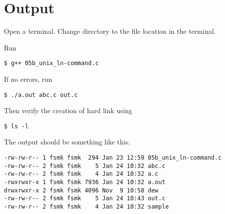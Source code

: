 

\section{Output}

Open a terminal. Change directory to the file location in the terminal.

Run
\begin{lstlisting}[style=shell-command]
$ g++ 05b_unix_ln-command.c
\end{lstlisting}

If no errors, run
\begin{lstlisting}[style=shell-command]
$ ./a.out abc.c out.c
\end{lstlisting}

Then verify the creation of hard link using
\begin{lstlisting}[style=shell-command]
$ ls -l
\end{lstlisting}


The output should be something like this.
\begin{lstlisting}[style=shell-output]
-rw-rw-r-- 1 fsmk fsmk  294 Jan 23 12:59 05b_unix_ln-command.c
-rw-rw-r-- 2 fsmk fsmk    5 Jan 24 10:32 abc.c
-rw-rw-r-- 2 fsmk fsmk    4 Jan 24 10:32 a.c
-rwxrwxr-x 1 fsmk fsmk 7936 Jan 24 10:32 a.out
drwxrwxr-x 2 fsmk fsmk 4096 Nov  9 10:58 dew
-rw-rw-r-- 2 fsmk fsmk    5 Jan 24 10:43 out.c
-rw-rw-r-- 2 fsmk fsmk    4 Jan 24 10:32 sample
\end{lstlisting}
